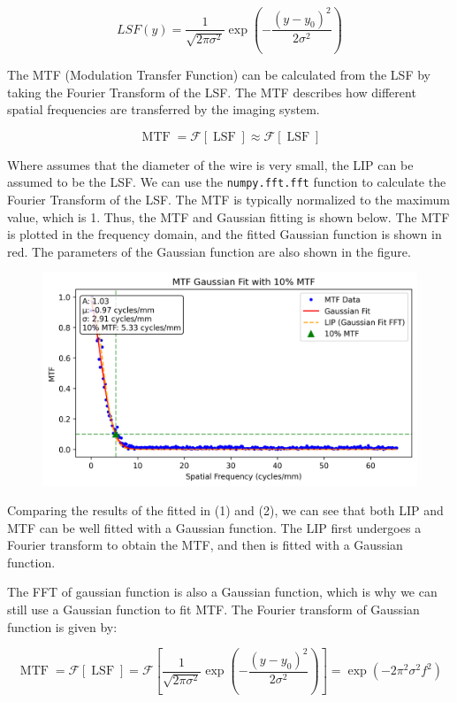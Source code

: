 \documentclass[12pt, a4paper, oneside]{ctexart}
\begin{document}
\[LSF(y) = \frac{1}{\sqrt{2\pi\sigma^2}} \exp\left(-\frac{(y - y_0)^2}{2\sigma^2}\right)\]


The MTF (Modulation Transfer Function) can be calculated from the LSF by taking the Fourier Transform of the LSF.  The MTF describes how different spatial frequencies are transferred by the imaging system.


\[
\operatorname {MTF} ={\mathcal {F}}\left[\operatorname {LSF} \right]
\approx {\mathcal {F}}\left[\operatorname {LSF} \right]
\]

Where assumes that the diameter of the wire is very small, the LIP can be assumed to be the LSF. We can use the \texttt{numpy.fft.fft} function to calculate the Fourier Transform of the LSF. The MTF is typically normalized to the maximum value, which is 1. Thus, the MTF and Gaussian fitting is shown below. The MTF is plotted in the frequency domain, and the fitted Gaussian function is shown in red. The parameters of the Gaussian function are also shown in the figure.

\begin{figure}[htp]
	\centering
	\includegraphics[width=1\textwidth]{./result/mtf_gaussian_fit.png}

\end{figure}

Comparing the results of the fitted in (1) and (2), we can see that both LIP and MTF can be well fitted with a Gaussian function. The LIP first undergoes a Fourier transform to obtain the MTF, and then is fitted with a Gaussian function. 

The FFT of gaussian function is also a Gaussian function, which is why we can still use a Gaussian function to fit MTF. The Fourier transform of  Gaussian function is given by:

\[
	\operatorname {MTF} ={\mathcal {F}}\left[\operatorname {LSF} \right]
	= {\mathcal {F}}\left[\frac{1}{\sqrt{2\pi\sigma^2}} \exp\left(-\frac{(y - y_0)^2}{2\sigma^2}\right)\right]
	=\exp\left(-2\pi^{2}\sigma^{2}f^{2}\right)
\]
\end{document}

